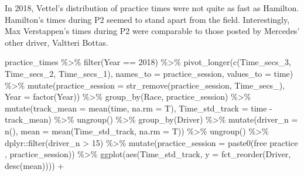 \documentclass[
]{book}
\newenvironment{Shaded}{\begin{snugshade}}{\end{snugshade}}
\newcommand{\AttributeTok}[1]{\textcolor[rgb]{0.77,0.63,0.00}{#1}}
\newcommand{\DecValTok}[1]{\textcolor[rgb]{0.00,0.00,0.81}{#1}}
\newcommand{\FunctionTok}[1]{\textcolor[rgb]{0.00,0.00,0.00}{#1}}
\newcommand{\NormalTok}[1]{#1}
\newcommand{\SpecialCharTok}[1]{\textcolor[rgb]{0.00,0.00,0.00}{#1}}
\newcommand{\StringTok}[1]{\textcolor[rgb]{0.31,0.60,0.02}{#1}}
\begin{document}
In 2018, Vettel's distribution of practice times were not quite as fast as Hamilton. Hamilton's times during P2 seemed to stand apart from the field. Interestingly, Max Verstappen's times during P2 were comparable to those posted by Mercedes' other driver, Valtteri Bottas.

\begin{Shaded}
\begin{Highlighting}[]
\NormalTok{practice\_times }\SpecialCharTok{\%\textgreater{}\%}
  \FunctionTok{filter}\NormalTok{(Year }\SpecialCharTok{==} \DecValTok{2018}\NormalTok{) }\SpecialCharTok{\%\textgreater{}\%} 
  \FunctionTok{pivot\_longer}\NormalTok{(}\FunctionTok{c}\NormalTok{(Time\_secs\_3, Time\_secs\_2, Time\_secs\_1), }\AttributeTok{names\_to =} \StringTok{\textquotesingle{}practice\_session\textquotesingle{}}\NormalTok{, }\AttributeTok{values\_to =} \StringTok{\textquotesingle{}time\textquotesingle{}}\NormalTok{) }\SpecialCharTok{\%\textgreater{}\%}
  \FunctionTok{mutate}\NormalTok{(}\AttributeTok{practice\_session =} \FunctionTok{str\_remove}\NormalTok{(practice\_session, }\StringTok{\textquotesingle{}Time\_secs\_\textquotesingle{}}\NormalTok{),}
         \AttributeTok{Year =} \FunctionTok{factor}\NormalTok{(Year)) }\SpecialCharTok{\%\textgreater{}\%}
   \FunctionTok{group\_by}\NormalTok{(Race, practice\_session) }\SpecialCharTok{\%\textgreater{}\%}
   \FunctionTok{mutate}\NormalTok{(}\AttributeTok{track\_mean =} \FunctionTok{mean}\NormalTok{(time, }\AttributeTok{na.rm =}\NormalTok{ T),}
          \AttributeTok{Time\_std\_track =}\NormalTok{ time }\SpecialCharTok{{-}}\NormalTok{ track\_mean) }\SpecialCharTok{\%\textgreater{}\%} 
   \FunctionTok{ungroup}\NormalTok{() }\SpecialCharTok{\%\textgreater{}\%} 
   \FunctionTok{group\_by}\NormalTok{(Driver) }\SpecialCharTok{\%\textgreater{}\%} 
   \FunctionTok{mutate}\NormalTok{(}\AttributeTok{driver\_n =} \FunctionTok{n}\NormalTok{(),}
          \AttributeTok{mean =} \FunctionTok{mean}\NormalTok{(Time\_std\_track, }\AttributeTok{na.rm =}\NormalTok{ T)) }\SpecialCharTok{\%\textgreater{}\%}
   \FunctionTok{ungroup}\NormalTok{() }\SpecialCharTok{\%\textgreater{}\%}
\NormalTok{   dplyr}\SpecialCharTok{::}\FunctionTok{filter}\NormalTok{(driver\_n }\SpecialCharTok{\textgreater{}} \DecValTok{15}\NormalTok{) }\SpecialCharTok{\%\textgreater{}\%} 
  \FunctionTok{mutate}\NormalTok{(}\AttributeTok{practice\_session =} \FunctionTok{paste0}\NormalTok{(}\StringTok{\textquotesingle{}free practice \textquotesingle{}}\NormalTok{, practice\_session)) }\SpecialCharTok{\%\textgreater{}\%}   
   \FunctionTok{ggplot}\NormalTok{(}\FunctionTok{aes}\NormalTok{(Time\_std\_track, }\AttributeTok{y =} \FunctionTok{fct\_reorder}\NormalTok{(Driver, }\FunctionTok{desc}\NormalTok{(mean)))) }\SpecialCharTok{+}

\end{Highlighting}
\end{Shaded}
\end{document}
